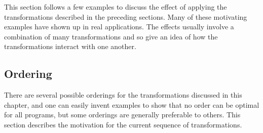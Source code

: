 This section follows a few examples to discuss the effect of applying the
transformations described in the preceding sections. Many of these motivating
examples have shown up in real applications. The effects usually involve a
combination of many transformations and so give an idea of how the
transformations interact with one another.

\subsection{Ordering}


There are several possible orderings for the transformations discussed in this
chapter, and one can easily invent examples to show that no order can be optimal
for all programs, but some orderings are generally preferable to others. This
section describes the motivation for the current sequence of transformations.

